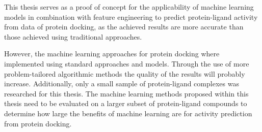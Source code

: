 This thesis serves as a proof of concept for the applicability of machine learning models in combination with feature engineering to predict protein-ligand activity from data of protein docking, as the achieved results 
are more accurate than those achieved using traditional approaches.

However, the machine learning approaches for protein docking where implemented using standard approaches and models. 
Through the use of more problem-tailored algorithmic methods the quality of the results will probably increase. Additionally, only a small sample 
of protein-ligand complexes was researched for this thesis. The machine learning methods proposed within this thesis need to be evaluated on a larger subset of 
protein-ligand compounds to determine how large the benefits of machine learning are for activity prediction from protein docking.
